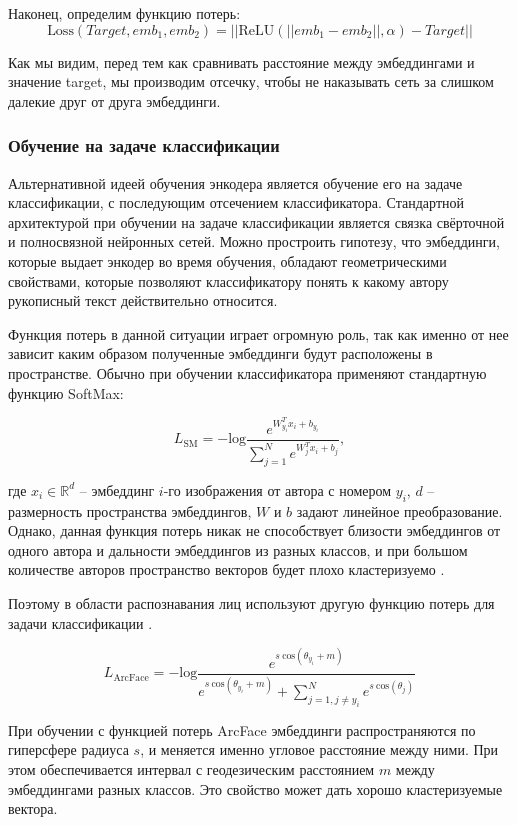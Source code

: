 \noindent
Наконец, определим функцию потерь:
$$\text{Loss}(Target, emb_1, emb_2) = ||\text{ReLU}(|| emb_1 - emb_2 ||, \alpha) - Target||$$

\noindent
Как мы видим, перед тем как сравнивать расстояние между эмбеддингами и значение target, мы производим отсечку, чтобы не наказывать сеть за слишком далекие друг от друга эмбеддинги.

\subsubsection{Обучение на задаче классификации}

Альтернативной идеей обучения энкодера является обучение его на задаче классификации, с последующим отсечением классификатора. Стандартной архитектурой при обучении на задаче классификации является связка свёрточной и полносвязной нейронных сетей. Можно простроить гипотезу, что эмбеддинги, которые выдает энкодер во время обучения, обладают геометрическими свойствами, которые позволяют классификатору понять к какому автору рукописный текст действительно относится.

Функция потерь в данной ситуации играет огромную роль, так как именно от нее зависит каким образом полученные эмбеддинги будут расположены в пространстве. Обычно при обучении классификатора применяют стандартную функцию SoftMax:

$$
L_{\text{SM}} = -\text{log} \frac{e^{W_{y_i}^T x_i + b_{y_i}}}{\sum_{j=1}^{N} e^{W_{j}^T x_i + b_{j}}},
$$
\smallskip

\noindent
где $x_i \in \mathbb{R}^d$ -- эмбеддинг $i$-го изображения от автора с номером $y_i$, $d$ -- размерность пространства эмбеддингов, $W$ и $b$ задают линейное преобразование. Однако, данная функция потерь никак не способствует близости эмбеддингов от одного автора и дальности эмбеддингов из разных классов, и при большом количестве авторов пространство векторов будет плохо кластеризуемо \cite{arcface}. 

Поэтому в области распознавания лиц используют другую функцию потерь для задачи классификации \cite{arcface}. 

$$
L_{\text{ArcFace}} = - \text{log} \frac{e^{s\:\text{cos}(\theta_{y_i} + m)}}
{e^{s\:\text{cos}(\theta_{y_i} + m)} + \sum^{N}_{j=1, j \neq y_i} e^{s\:\text{cos}(\theta_j)}}
$$
\smallskip

При обучении с функцией потерь ArcFace эмбеддинги распространяются по гиперсфере радиуса $s$, и меняется именно угловое расстояние между ними. При этом обеспечивается интервал с геодезическим расстоянием $m$ между эмбеддингами разных классов. Это свойство может дать хорошо кластеризуемые вектора.

